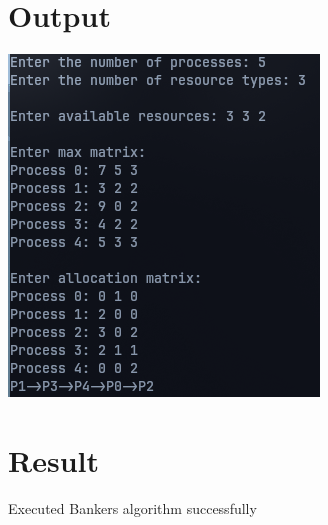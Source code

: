 \section{Output}
\includegraphics[width=0.5\linewidth]{Cycle_3//Outputs/bankers.png}


\section{Result}
Executed Bankers algorithm successfully